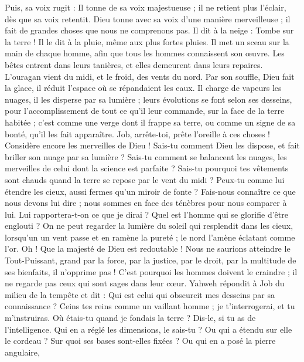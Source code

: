 \begin{multicols}{2}
Puis, sa voix rugit : Il tonne de sa voix majestueuse ; il ne retient plus l'éclair, dès que sa voix retentit.
Dieu tonne avec sa voix d'une manière merveilleuse ; il fait de grandes choses que nous ne comprenons pas.
Il dit à la neige : Tombe sur la terre ! Il le dit à la pluie, même aux plus fortes pluies.
Il met un sceau sur la main de chaque homme, afin que tous les hommes connaissent son œuvre.
Les bêtes entrent dans leurs tanières, et elles demeurent dans leurs repaires.
L'ouragan vient du midi, et le froid, des vents du nord.
Par son souffle, Dieu fait la glace, il réduit l'espace où se répandaient les eaux.
Il charge de vapeurs les nuages, il les disperse par sa lumière ;
leurs évolutions se font selon ses desseins, pour l'accomplissement de tout ce qu'il leur commande, sur la face de la terre habitée ;
c'est comme une verge dont il frappe sa terre, ou comme un signe de sa bonté, qu'il les fait apparaître.
Job, arrête-toi, prête l'oreille à ces choses ! Considère encore les merveilles de Dieu !
Sais-tu comment Dieu les dispose, et fait briller son nuage par sa lumière ?
Sais-tu comment se balancent les nuages, les merveilles de celui dont la science est parfaite ?
Sais-tu pourquoi tes vêtements sont chauds quand la terre se repose par le vent du midi ?
Peux-tu comme lui étendre les cieux, aussi fermes qu'un miroir de fonte ?
Fais-nous connaître ce que nous devons lui dire ; nous sommes en face des ténèbres pour nous comparer à lui.
Lui rapportera-t-on ce que je dirai ? Quel est l'homme qui se glorifie d'être englouti ?
On ne peut regarder la lumière du soleil qui resplendit dans les cieux, lorsqu'un un vent passe et en ramène la pureté ;
le nord l'amène éclatant comme l'or. Oh ! Que la majesté de Dieu est redoutable !
Nous ne saurions atteindre le Tout-Puissant, grand par la force, par la justice, par le droit, par la multitude de ses bienfaits, il n'opprime pas !
C'est pourquoi les hommes doivent le craindre ; il ne regarde pas ceux qui sont sages dans leur cœur.
\VerseOne{}Yahweh répondit à Job du milieu de la tempête et dit :
Qui est celui qui obscurcit mes desseins par sa connaissance ?
Ceins tes reins comme un vaillant homme ; je t'interrogerai, et tu m'instruiras.
Où étais-tu quand je fondais la terre ? Dis-le, si tu as de l'intelligence.
Qui en a réglé les dimensions, le sais-tu ? Ou qui a étendu sur elle le cordeau ?
Sur quoi ses bases sont-elles fixées ? Ou qui en a posé la pierre angulaire,

\end{multicols}

